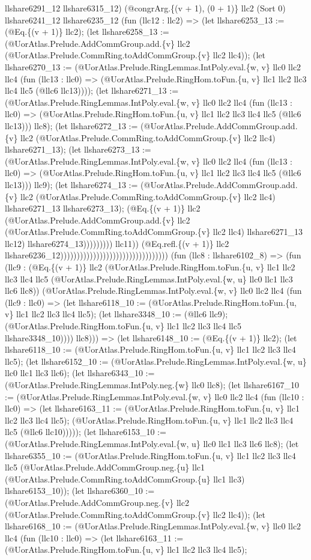 \documentclass[11pt]{article}
\begin{document}
llshare6291\_12 llshare6315\_12) (@congrArg.\{(v + 1), (0 + 1)\} llc2 (Sort 0) llshare6241\_12 llshare6235\_12 (fun (llc12 : llc2) => (let llshare6253\_13 := (@Eq.\{(v + 1)\} llc2); (let llshare6258\_13 := (@UorAtlas.Prelude.AddCommGroup.add.\{v\} llc2 (@UorAtlas.Prelude.CommRing.toAddCommGroup.\{v\} llc2 llc4)); (let llshare6270\_13 := (@UorAtlas.Prelude.RingLemmas.IntPoly.eval.\{w, v\} llc0 llc2 llc4 (fun (llc13 : llc0) => (@UorAtlas.Prelude.RingHom.toFun.\{u, v\} llc1 llc2 llc3 llc4 llc5 (@llc6 llc13)))); (let llshare6271\_13 := (@UorAtlas.Prelude.RingLemmas.IntPoly.eval.\{w, v\} llc0 llc2 llc4 (fun (llc13 : llc0) => (@UorAtlas.Prelude.RingHom.toFun.\{u, v\} llc1 llc2 llc3 llc4 llc5 (@llc6 llc13))) llc8); (let llshare6272\_13 := (@UorAtlas.Prelude.AddCommGroup.add.\{v\} llc2 (@UorAtlas.Prelude.CommRing.toAddCommGroup.\{v\} llc2 llc4) llshare6271\_13); (let llshare6273\_13 := (@UorAtlas.Prelude.RingLemmas.IntPoly.eval.\{w, v\} llc0 llc2 llc4 (fun (llc13 : llc0) => (@UorAtlas.Prelude.RingHom.toFun.\{u, v\} llc1 llc2 llc3 llc4 llc5 (@llc6 llc13))) llc9); (let llshare6274\_13 := (@UorAtlas.Prelude.AddCommGroup.add.\{v\} llc2 (@UorAtlas.Prelude.CommRing.toAddCommGroup.\{v\} llc2 llc4) llshare6271\_13 llshare6273\_13); (@Eq.\{(v + 1)\} llc2 (@UorAtlas.Prelude.AddCommGroup.add.\{v\} llc2 (@UorAtlas.Prelude.CommRing.toAddCommGroup.\{v\} llc2 llc4) llshare6271\_13 llc12) llshare6274\_13))))))))) llc11)) (@Eq.refl.\{(v + 1)\} llc2 llshare6236\_12))))))))))))))))))))))))))))))))) (fun (llc8 : llshare6102\_8) => (fun (llc9 : (@Eq.\{(v + 1)\} llc2 (@UorAtlas.Prelude.RingHom.toFun.\{u, v\} llc1 llc2 llc3 llc4 llc5 (@UorAtlas.Prelude.RingLemmas.IntPoly.eval.\{w, u\} llc0 llc1 llc3 llc6 llc8)) (@UorAtlas.Prelude.RingLemmas.IntPoly.eval.\{w, v\} llc0 llc2 llc4 (fun (llc9 : llc0) => (let llshare6118\_10 := (@UorAtlas.Prelude.RingHom.toFun.\{u, v\} llc1 llc2 llc3 llc4 llc5); (let llshare3348\_10 := (@llc6 llc9); (@UorAtlas.Prelude.RingHom.toFun.\{u, v\} llc1 llc2 llc3 llc4 llc5 llshare3348\_10)))) llc8))) => (let llshare6148\_10 := (@Eq.\{(v + 1)\} llc2); (let llshare6118\_10 := (@UorAtlas.Prelude.RingHom.toFun.\{u, v\} llc1 llc2 llc3 llc4 llc5); (let llshare6152\_10 := (@UorAtlas.Prelude.RingLemmas.IntPoly.eval.\{w, u\} llc0 llc1 llc3 llc6); (let llshare6343\_10 := (@UorAtlas.Prelude.RingLemmas.IntPoly.neg.\{w\} llc0 llc8); (let llshare6167\_10 := (@UorAtlas.Prelude.RingLemmas.IntPoly.eval.\{w, v\} llc0 llc2 llc4 (fun (llc10 : llc0) => (let llshare6163\_11 := (@UorAtlas.Prelude.RingHom.toFun.\{u, v\} llc1 llc2 llc3 llc4 llc5); (@UorAtlas.Prelude.RingHom.toFun.\{u, v\} llc1 llc2 llc3 llc4 llc5 (@llc6 llc10))))); (let llshare6153\_10 := (@UorAtlas.Prelude.RingLemmas.IntPoly.eval.\{w, u\} llc0 llc1 llc3 llc6 llc8); (let llshare6355\_10 := (@UorAtlas.Prelude.RingHom.toFun.\{u, v\} llc1 llc2 llc3 llc4 llc5 (@UorAtlas.Prelude.AddCommGroup.neg.\{u\} llc1 (@UorAtlas.Prelude.CommRing.toAddCommGroup.\{u\} llc1 llc3) llshare6153\_10)); (let llshare6360\_10 := (@UorAtlas.Prelude.AddCommGroup.neg.\{v\} llc2 (@UorAtlas.Prelude.CommRing.toAddCommGroup.\{v\} llc2 llc4)); (let llshare6168\_10 := (@UorAtlas.Prelude.RingLemmas.IntPoly.eval.\{w, v\} llc0 llc2 llc4 (fun (llc10 : llc0) => (let llshare6163\_11 := (@UorAtlas.Prelude.RingHom.toFun.\{u, v\} llc1 llc2 llc3 llc4 llc5); 
\end{document}
